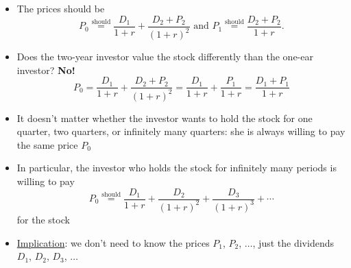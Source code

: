 \documentclass{beamer}
\newcommand{\should}{\overset{\text{should}}{=}}
\begin{document}
\begin{frame}{}
	\begin{figure}[H]
		\begin{center}
		\end{center}
	\end{figure}
\begin{itemize}
\item The prices should be
\begin{equation*}
	P_{0}\should\frac{D_{1}}{1+r}+\frac{D_{2}+P_{2}}{(1+r)^2}\text{ and } P_{1}\should\frac{D_{2}+P_{2}}{1+r}.
\end{equation*}
\item Does the two-year investor value the stock differently than the one-ear investor? \textbf{No!}
\begin{equation*}
	P_{0}=\frac{D_{1}}{1+r}+\frac{D_{2}+P_{2}}{(1+r)^2}=\frac{D_{1}}{1+r}+\frac{P_{1}}{1+r}=\frac{D_{1}+P_{1}}{1+r}
\end{equation*}
\end{itemize}
\end{frame}

\begin{frame}{}
	\begin{itemize}
		\item It doesn't matter whether the investor wants to hold the stock for one quarter, two quarters, or infinitely many quarters: she is always willing to pay the same price $P_{0}$
		\item In particular, the investor who holds the stock for infinitely many periods is willing to pay 
		\begin{equation*}
			P_{0}\should\frac{D_{1}}{1+r}+\frac{D_{2}}{(1+r)^2}+\frac{D_{3}}{(1+r)^3}+\cdots 
		\end{equation*}
		for the stock
		\item \underline{Implication}: we don't need to know the prices $P_{1}$, $P_{2}$, $\ldots$, just the dividends $D_{1}$, $D_{2}$, $D_{3}$, $\ldots$
	\end{itemize}
\end{frame}
\end{document}
